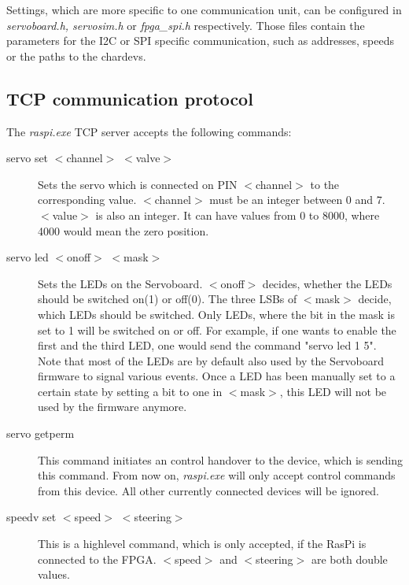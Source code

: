 \documentclass[a4paper
               ,10pt
               ,DIV=10 %
               ,BCOR=0.3cm
               ,pagesize %
               ,headings=small
               ,bibtotoc
               ]
               {scrartcl}
\begin{document}
Settings, which are more specific to one communication unit, can be configured in \textit{servoboard.h, servosim.h} or \textit{fpga\_spi.h} respectively. Those files contain the parameters for the I2C or SPI specific communication, such as addresses, speeds or the paths to the chardevs.

\subsection{TCP communication protocol}
The \textit{raspi.exe} TCP server accepts the following commands:
\begin{description}
\item[servo set $<$channel$>$ $<$valve$>$] Sets the servo which is connected on PIN $<$channel$>$ to the corresponding value. $<$channel$>$ must be an integer between 0 and 7. $<$value$>$ is also an integer. It can have values from 0 to 8000, where 4000 would mean the zero position.
\item[servo led $<$onoff$>$ $<$mask$>$] Sets the LEDs on the Servoboard. $<$onoff$>$ decides, whether the LEDs should be switched on(1) or off(0). The three LSBs of $<$mask$>$ decide, which LEDs should be switched. Only LEDs, where the bit in the mask is set to 1 will be switched on or off. For example, if one wants to enable the first and the third LED, one would send the command "servo led 1 5". Note that most of the LEDs are by default also used by the Servoboard firmware to signal various events. Once a LED has been manually set to a certain state by setting a bit to one in $<$mask$>$, this LED will not be used by the firmware anymore.
\item[servo getperm] This command initiates an control handover to the device, which is sending this command. From now on, \textit{raspi.exe} will only accept control commands from this device. All other currently connected devices will be ignored.
\item[speedv set $<$speed$>$ $<$steering$>$] This is a highlevel command, which is only accepted, if the RasPi is connected to the FPGA. $<$speed$>$ and $<$steering$>$ are both double values.
\end{description}
\end{document}
